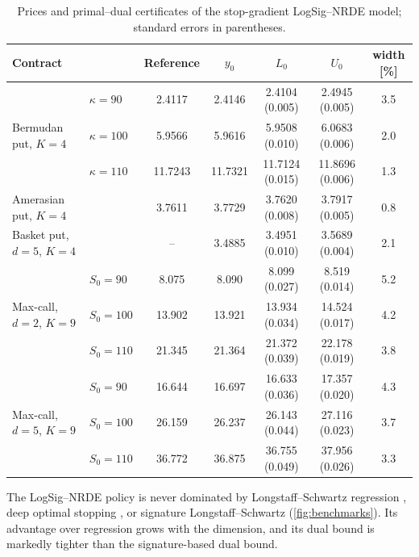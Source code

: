 \begin{table}[htbp]
\centering\footnotesize
\caption{Prices and primal--dual certificates of the stop-gradient LogSig--NRDE model; standard errors in parentheses.}
\label{tab:certificates}
\setlength{\tabcolsep}{4pt}
\begin{tabular}{@{}l l c c c c c@{}}
\toprule
Contract & & Reference & $y_0$ & $L_0$ & $U_0$ & width [\%]\\
\midrule
\multirow{3}{*}{Bermudan put, $K=4$} & $\kappa=90$  & 2.4117 & 2.4146 & 2.4104 {\scriptsize(0.005)} & 2.4945 {\scriptsize(0.005)} & 3.5\\
                                     & $\kappa=100$ & 5.9566 & 5.9616 & 5.9508 {\scriptsize(0.010)} & 6.0683 {\scriptsize(0.006)} & 2.0\\
                                     & $\kappa=110$ & 11.7243 & 11.7321 & 11.7124 {\scriptsize(0.015)} & 11.8696 {\scriptsize(0.006)} & 1.3\\
Amerasian put, $K=4$ & & 3.7611 & 3.7729 & 3.7620 {\scriptsize(0.008)} & 3.7917 {\scriptsize(0.005)} & 0.8\\
Basket put, $d=5$, $K=4$ & & -- & 3.4885 & 3.4951 {\scriptsize(0.010)} & 3.5689 {\scriptsize(0.004)} & 2.1\\
\midrule
\multirow{3}{*}{Max-call, $d=2$, $K=9$} & $S_0=90$  & 8.075 & 8.090 & 8.099 {\scriptsize(0.027)} & 8.519 {\scriptsize(0.014)} & 5.2\\
                                        & $S_0=100$ & 13.902 & 13.921 & 13.934 {\scriptsize(0.034)} & 14.524 {\scriptsize(0.017)} & 4.2\\
                                        & $S_0=110$ & 21.345 & 21.364 & 21.372 {\scriptsize(0.039)} & 22.178 {\scriptsize(0.019)} & 3.8\\
\multirow{3}{*}{Max-call, $d=5$, $K=9$} & $S_0=90$  & 16.644 & 16.697 & 16.633 {\scriptsize(0.036)} & 17.357 {\scriptsize(0.020)} & 4.3\\
                                        & $S_0=100$ & 26.159 & 26.237 & 26.143 {\scriptsize(0.044)} & 27.116 {\scriptsize(0.023)} & 3.7\\
                                        & $S_0=110$ & 36.772 & 36.875 & 36.755 {\scriptsize(0.049)} & 37.956 {\scriptsize(0.026)} & 3.3\\
\bottomrule
\end{tabular}
\end{table}

The LogSig--NRDE policy is never dominated by Longstaff--Schwartz regression \cite{longstaff2001}, deep optimal stopping \cite{becker2019}, or signature Longstaff--Schwartz \cite{bayer2025primal} (\cref{fig:benchmarks}). Its advantage over regression grows with the dimension, and its dual bound is markedly tighter than the signature-based dual bound.

